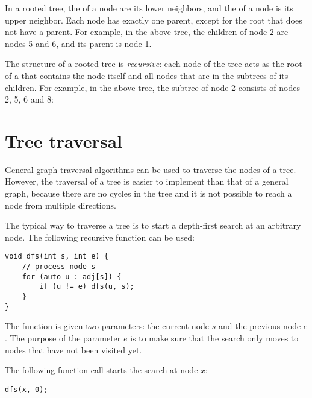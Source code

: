 In a rooted tree, the  of a node
are its lower neighbors, and the  of a node
is its upper neighbor.
Each node has exactly one parent,
except for the root that does not have a parent.
For example, in the above tree,
the children of node 2 are nodes 5 and 6,
and its parent is node 1.


The structure of a rooted tree is \emph{recursive}:
each node of the tree acts as the root of a 
that contains the node itself and all nodes
that are in the subtrees of its children.
For example, in the above tree, the subtree of node 2
consists of nodes 2, 5, 6 and 8:
\begin{center}
\end{center}

\section{Tree traversal}

General graph traversal algorithms
can be used to traverse the nodes of a tree.
However, the traversal of a tree is easier to implement than
that of a general graph, because
there are no cycles in the tree and it is not
possible to reach a node from multiple directions.

The typical way to traverse a tree is to start
a depth-first search at an arbitrary node.
The following recursive function can be used:

\begin{lstlisting}
void dfs(int s, int e) {
    // process node s
    for (auto u : adj[s]) {
        if (u != e) dfs(u, s);
    }
}
\end{lstlisting}

The function is given two parameters: the current node $s$
and the previous node $e$.
The purpose of the parameter $e$ is to make sure
that the search only moves to nodes
that have not been visited yet.

The following function call starts the search
at node $x$:

\begin{lstlisting}
dfs(x, 0);
\end{lstlisting}

